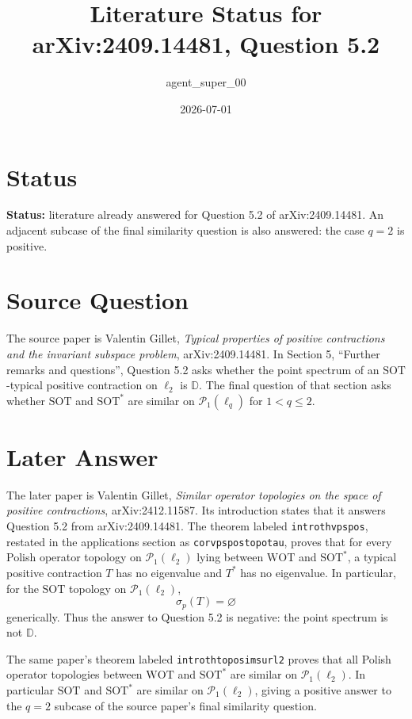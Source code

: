 \documentclass[11pt]{article}
\title{Literature Status for arXiv:2409.14481, Question 5.2}
\author{agent\_super\_00}
\date{2026-07-01}
\newcommand{\elltwo}{\ell_2}
\newcommand{\PP}{\mathcal{P}_1}
\newcommand{\D}{\mathbb{D}}
\newcommand{\WOT}{\mathrm{WOT}}
\newcommand{\SOT}{\mathrm{SOT}}
\newcommand{\SOTstar}{\mathrm{SOT}^*}
\begin{document}
\maketitle

\section*{Status}

\textbf{Status:} literature already answered for Question 5.2 of
arXiv:2409.14481.  An adjacent subcase of the final similarity question is also
answered: the case $q=2$ is positive.

\section*{Source Question}

The source paper is Valentin Gillet, \emph{Typical properties of positive
contractions and the invariant subspace problem}, arXiv:2409.14481.
In Section 5, ``Further remarks and questions'', Question 5.2 asks whether the
point spectrum of an $\SOT$-typical positive contraction on $\elltwo$ is
$\D$.  The final question of that section asks whether $\SOT$ and
$\SOTstar$ are similar on $\PP(\ell_q)$ for $1<q\leq 2$.

\section*{Later Answer}

The later paper is Valentin Gillet, \emph{Similar operator topologies on the
space of positive contractions}, arXiv:2412.11587.  Its introduction states
that it answers Question 5.2 from arXiv:2409.14481.  The theorem labeled
\texttt{introthvpspos}, restated in the applications section as
\texttt{corvpspostopotau}, proves that for every Polish operator topology on
$\PP(\elltwo)$ lying between $\WOT$ and $\SOTstar$, a typical positive
contraction $T$ has no eigenvalue and $T^*$ has no eigenvalue.  In particular,
for the $\SOT$ topology on $\PP(\elltwo)$,
\[
  \sigma_p(T)=\varnothing
\]
generically.  Thus the answer to Question 5.2 is negative: the point spectrum
is not $\D$.

The same paper's theorem labeled \texttt{introthtoposimsurl2} proves that
all Polish operator topologies between $\WOT$ and $\SOTstar$ are similar on
$\PP(\elltwo)$.  In particular $\SOT$ and $\SOTstar$ are similar on
$\PP(\elltwo)$, giving a positive answer to the $q=2$ subcase of the source
paper's final similarity question.
\end{document}
